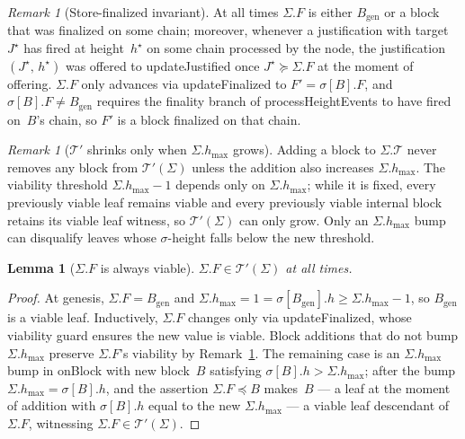 \ifx\litemode\undefined\documentclass{article}\fi
\newcommand{\genesis}{\ensuremath{B_{\mathrm{gen}}}}
\newcommand{\T}[0]{\ensuremath{\mathcal{T}}}
\newcommand{\hmax}{\ensuremath{h_{\max}}\xspace}
\newcommand{\viableTree}{\ensuremath{\mathcal{T}'}}
\newcommand{\processHeightEvents}{\textsf{processHeightEvents}\xspace}
\newcommand{\onBlock}{\textsf{onBlock}\xspace}
\newcommand{\updateJustified}{\textsf{updateJustified}\xspace}
\newcommand{\updateFinalized}{\textsf{updateFinalized}\xspace}
\theoremstyle{plain}
\newtheorem{lemma}{Lemma}
\theoremstyle{definition}
\theoremstyle{remark}
\newtheorem{remark}[theorem]{Remark}
\begin{document}
\begin{remark}[Store-finalized invariant]\label{rem:fs-invariant}
At all times $\Sigma.F$ is either $\genesis$ or a block that was finalized on some chain; moreover, whenever a justification with target~$J^\star$ has fired at height~$h^\star$ on some chain processed by the node, the justification $(J^\star,\, h^\star)$ was offered to \updateJustified once $J^\star \succeq \Sigma.F$ at the moment of offering.
$\Sigma.F$ only advances via \updateFinalized to $F' = \sigma[B].F$, and $\sigma[B].F \neq \genesis$ requires the finality branch of \processHeightEvents to have fired on~$B$'s chain, so $F'$ is a block finalized on that chain.
\end{remark}

\begin{remark}[$\viableTree$ shrinks only when $\Sigma.\hmax$ grows]\label{rem:viable-monotone}
Adding a block to $\Sigma.\T$ never removes any block from $\viableTree(\Sigma)$ unless the addition also increases $\Sigma.\hmax$.
The viability threshold $\Sigma.\hmax - 1$ depends only on $\Sigma.\hmax$; while it is fixed, every previously viable leaf remains viable and every previously viable internal block retains its viable leaf witness, so $\viableTree(\Sigma)$ can only grow.
Only an $\Sigma.\hmax$ bump can disqualify leaves whose $\sigma$-height falls below the new threshold.
\end{remark}

\begin{lemma}[$\Sigma.F$ is always viable]\label{lem:F-viable}
$\Sigma.F \in \viableTree(\Sigma)$ at all times.
\end{lemma}

\begin{proof}
At genesis, $\Sigma.F = \genesis$ and $\Sigma.\hmax = 1 = \sigma[\genesis].h \geq \Sigma.\hmax - 1$, so $\genesis$ is a viable leaf.
Inductively, $\Sigma.F$ changes only via \updateFinalized, whose viability guard ensures the new value is viable.
Block additions that do not bump $\Sigma.\hmax$ preserve $\Sigma.F$'s viability by Remark~\ref{rem:viable-monotone}.
The remaining case is an $\Sigma.\hmax$ bump in \onBlock with new block~$B$ satisfying $\sigma[B].h > \Sigma.\hmax$; after the bump $\Sigma.\hmax = \sigma[B].h$, and the assertion $\Sigma.F \preceq B$ makes~$B$ --- a leaf at the moment of addition with $\sigma[B].h$ equal to the new $\Sigma.\hmax$ --- a viable leaf descendant of~$\Sigma.F$, witnessing $\Sigma.F \in \viableTree(\Sigma)$.
\end{proof}
\end{document}

